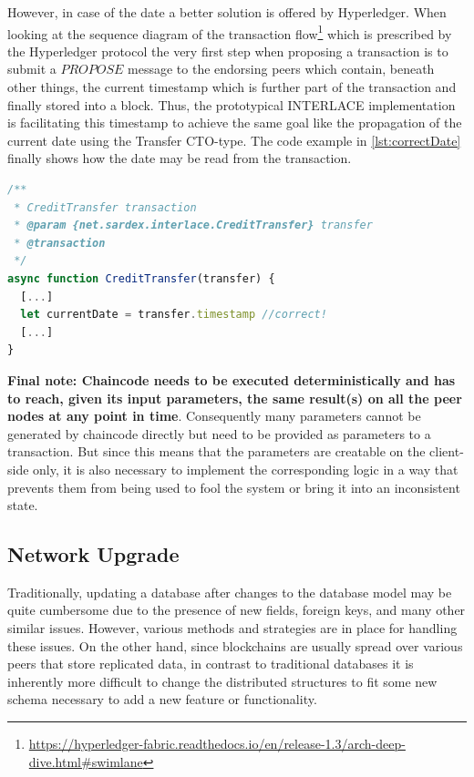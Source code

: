 However, in case of the date a better solution is offered by Hyperledger. When looking at the sequence diagram of the transaction flow\footnote{\url{https://hyperledger-fabric.readthedocs.io/en/release-1.3/arch-deep-dive.html\#swimlane}} which is prescribed by the Hyperledger protocol the very first step when proposing a transaction is to submit a $PROPOSE$ message to the endorsing peers which contain, beneath other things, the current timestamp which is further part of the transaction and finally stored into a block. Thus, the prototypical INTERLACE implementation is facilitating this timestamp to achieve the same goal like the propagation of the current date using the Transfer CTO-type. The code example in \ref{lst:correctDate} finally shows how the date may be read from the transaction.

\begin{center}
\begin{minipage}{0.8\textwidth}
\small
\begin{lstlisting}[language=javascript,firstnumber=1,caption={\bf\small An example of a correct determination of the current date inside of chain code}, captionpos=b,label=lst:correctDate]
/**
 * CreditTransfer transaction
 * @param {net.sardex.interlace.CreditTransfer} transfer
 * @transaction
 */
async function CreditTransfer(transfer) {
  [...]
  let currentDate = transfer.timestamp //correct!
  [...]
}
\end{lstlisting}
\end{minipage}
\end{center}


\textbf{Final note: Chaincode needs to be executed deterministically and has to reach, given its input parameters, the same result(s) on all the peer nodes at any point in time}. Consequently many parameters cannot be generated by chaincode directly but need to be provided as parameters to a transaction. But since this means that the parameters are creatable on the client-side only, it is also necessary to implement the corresponding logic in a way that prevents them from being used to fool the system or bring it into an inconsistent state.

\subsection{Network Upgrade}

Traditionally, updating a database after changes to the database model may be quite cumbersome due to the presence of new fields, foreign keys, and many other similar issues. However, various methods and strategies are in place for handling these issues.
On the other hand, since blockchains are usually spread over various peers that store replicated data, in contrast to traditional databases it is inherently more difficult to change the distributed structures to fit some new schema necessary to add a new feature or functionality.

